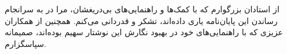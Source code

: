 


\begin{center}
\end{center}

از استادان بزرگوارم که با کمک‌ها و راهنمایی‌های بی‌دریغشان، مرا
در به سرانجام رساندن این پایان‌نامه یاری داده‌اند، تشکر و قدردانی می‌کنم.
همچنین از همکاران عزیزی که با راهنمایی‌های خود در بهبود نگارش این نوشتار
سهیم بوده‌اند، صمیمانه سپاسگزارم.
%
%
%
%

